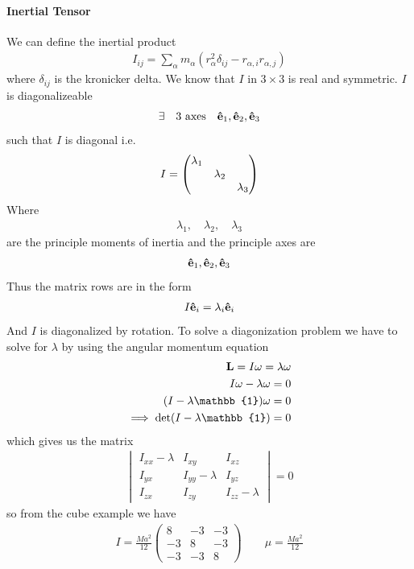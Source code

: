\documentclass[../main.tex]{subfiles}
\begin{document}
\paragraph*{Inertial Tensor} We can define the inertial product
\begin{align*}
    I_{ij} = \sum_\alpha m_\alpha (r_\alpha^2 \delta_{ij} - r_{\alpha, i} r_{\alpha, j})
\end{align*}
where $\delta_{ij}$ is the kronicker delta. We know that $I$ in $3 \times 3$ is real and symmetric. 
$I$ is diagonalizeable
\begin{align*}
    \exists \qqtext{3 axes} \vu e_1, \vu e_2, \vu e_3 
\end{align*}
such that $I$ is diagonal i.e.
\begin{align*}
    I = \mqty(\lambda_1 & & \\ & \lambda_2 & \\ & & \lambda_3)
\end{align*}
Where
\begin{align*}
    \lambda_1,\quad \lambda_2,\quad \lambda_3
\end{align*}
are the principle moments of inertia and the principle axes are
\begin{align*}
    \vu e_1, \vu e_2, \vu e_3
\end{align*}
Thus the matrix rows are in the form
\begin{align*}
    I \vu e_i = \lambda_i \vu e_i
\end{align*}
And $I$ is diagonalized by rotation. To solve a diagonization problem we have to solve for $\lambda$
by using the angular momentum equation
\begin{align*}
    \vb L = I \vb \omega = \lambda \vb \omega \\
    I \omega - \lambda \omega = 0 \\
    (I - \lambda \mathbb{1}) \vb \omega = 0 \\
    \implies \det(I - \lambda \mathbb{1}) = 0
\end{align*}
which gives us the matrix
\begin{align*}
    \begin{vmatrix}
        I_{xx} - \lambda & I_{xy} & I_{xz} \\
        I_{yx} & I_{yy} - \lambda & I_{yz} \\
        I_{zx} & I_{zy} & I_{zz} - \lambda
    \end{vmatrix} = 0
\end{align*}
so from the cube example we have
\begin{align*}
    I = \frac{Ma^2}{12} \begin{pmatrix}
        8 & -3 & -3 \\
        -3 & 8 & -3 \\
        -3 & -3 & 8
    \end{pmatrix} \qquad \mu = \frac{Ma^2}{12}
\end{align*}
\end{document}
